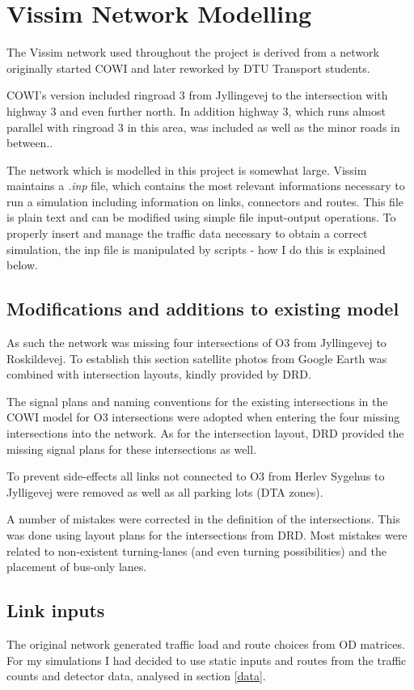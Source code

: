 \section{Vissim Network Modelling}
\label{modelling}
The Vissim network used throughout the project is derived from a network originally started COWI and later reworked by DTU Transport students.

COWI's version included ringroad 3 from Jyllingevej to the intersection with highway 3 and even further north. In addition highway 3, which runs almost parallel with ringroad 3 in this area, was included as well as the minor roads in between..

The network which is modelled in this project is somewhat large. Vissim maintains a \textit{.inp} file, which contains the most relevant informations necessary to run a simulation including information on links, connectors and routes. This file is plain text and can be modified using simple file input-output operations. To properly insert and manage the traffic data necessary to obtain a correct simulation, the inp file is manipulated by scripts - how I do this is explained below.

\subsection{Modifications and additions to existing model}

As such the network was missing four intersections of O3 from Jyllingevej to Roskildevej. To establish this section satellite photos from Google Earth was combined with intersection layouts, kindly provided by DRD.

The signal plans and naming conventions for the existing intersections in the COWI model for O3 intersections were adopted when entering the four missing intersections into the network. As for the intersection layout, DRD provided the missing signal plans for these intersections as well.

To prevent side-effects all links not connected to O3 from Herlev Sygehus to Jylligevej were removed as well as all parking lots (DTA zones).

A number of mistakes were corrected in the definition of the intersections. This was done using layout plans for the intersections from DRD. Most mistakes were related to non-existent turning-lanes (and even turning possibilities) and the placement of bus-only lanes. 

\subsection{Link inputs}
The original network generated traffic load and route choices from OD matrices. For my simulations I had decided to use static inputs and routes from the traffic counts and detector data, analysed in section \ref{data}. 


